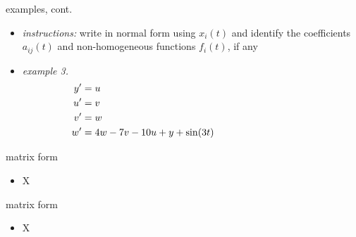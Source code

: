 \documentclass[urlcolor=blue,dvipsnames]{beamer}
\begin{document}
\begin{frame}{examples, cont.}

\small
\begin{itemize}
\item \emph{instructions:} write in normal form using $x_i(t)$ and identify the coefficients $a_{ij}(t)$ and non-homogeneous functions $f_i(t)$, if any
\item \emph{example 3.}
\begin{align*}
y' &= u \hspace{75mm} \\
u' &= v \\
v' &= w \\
w' &= 4w-7v-10u+y+\sin(3t)
\end{align*}
\end{itemize}

\vspace{40mm}
\end{frame}


\begin{frame}{matrix form}

\begin{itemize}
\item X
\end{itemize}
\end{frame}


\begin{frame}{matrix form}

\begin{itemize}
\item X
\end{itemize}
\end{frame}
\end{document}
